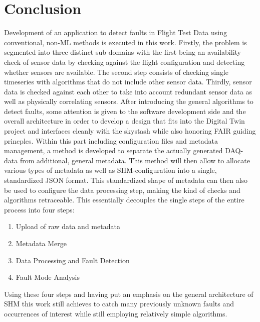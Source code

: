\chapter{Conclusion}
Development of an application to detect faults in Flight Test Data using conventional, non-ML methods is executed in this work. Firstly, the problem is segmented into three distinct sub-domains with the first being an availability check of sensor data by checking against the flight configuration and detecting whether sensors are available. The second step consists of checking single timeseries with algorithms that do not include other sensor data.  Thirdly, sensor data is checked against each other to take into account redundant sensor data as well as physically correlating sensors. After introducing the general algorithms to detect faults, some attention is given to the software development side and the overall architecture in order to develop a design that fits into the Digital Twin project and interfaces cleanly with the skystash while also honoring FAIR guiding princples. Within this part including configuration files and metadata management, a method is developed to separate the actually generated DAQ-data from additional, general metadata. This method will then allow to allocate various types of metadata as well as SHM-configuration into a single, standardized JSON format. This standardized shape of metadata can then also be used to configure the data processing step, making the kind of checks and algorithms retraceable. This essentially decouples the single steps of the entire process into four steps:

\begin{enumerate}
        \item Upload of raw data and metadata
        \item Metadata Merge
        \item Data Processing and Fault Detection
        \item Fault Mode Analysis
\end{enumerate}

Using these four steps and having put an emphasis on the general architecture of SHM this work still achieves to catch many previously unknown faults and occurrences of interest while still employing relatively simple algorithms.

